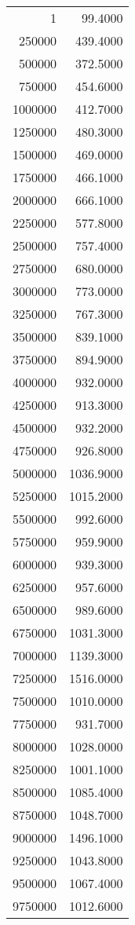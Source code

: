 \begin{table}
	\footnotesize
	\centering
	\begin{tabular}{|r|r|}
		1 & 99.4000 \\ 
		250000 & 439.4000 \\ 
		500000 & 372.5000 \\ 
		750000 & 454.6000 \\ 
		1000000 & 412.7000 \\ 
		1250000 & 480.3000 \\ 
		1500000 & 469.0000 \\ 
		1750000 & 466.1000 \\ 
		2000000 & 666.1000 \\ 
		2250000 & 577.8000 \\ 
		2500000 & 757.4000 \\ 
		2750000 & 680.0000 \\ 
		3000000 & 773.0000 \\ 
		3250000 & 767.3000 \\ 
		3500000 & 839.1000 \\ 
		3750000 & 894.9000 \\ 
		4000000 & 932.0000 \\ 
		4250000 & 913.3000 \\ 
		4500000 & 932.2000 \\ 
		4750000 & 926.8000 \\ 
		5000000 & 1036.9000 \\ 
		5250000 & 1015.2000 \\ 
		5500000 & 992.6000 \\ 
		5750000 & 959.9000 \\ 
		6000000 & 939.3000 \\ 
		6250000 & 957.6000 \\ 
		6500000 & 989.6000 \\ 
		6750000 & 1031.3000 \\ 
		7000000 & 1139.3000 \\ 
		7250000 & 1516.0000 \\ 
		7500000 & 1010.0000 \\ 
		7750000 & 931.7000 \\ 
		8000000 & 1028.0000 \\ 
		8250000 & 1001.1000 \\ 
		8500000 & 1085.4000 \\ 
		8750000 & 1048.7000 \\ 
		9000000 & 1496.1000 \\ 
		9250000 & 1043.8000 \\ 
		9500000 & 1067.4000 \\ 
		9750000 & 1012.6000 \\ 
	\end{tabular}
\end{table}